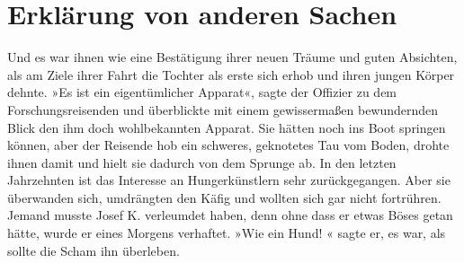 \section{Erklärung von anderen Sachen}\label{s:AndereSachen}

Und es war ihnen wie eine Bestätigung ihrer neuen Träume und guten Absichten, als am Ziele ihrer Fahrt die Tochter als erste sich erhob und ihren jungen Körper dehnte. »Es ist ein eigentümlicher Apparat«, sagte der Offizier zu dem Forschungsreisenden und überblickte mit einem gewissermaßen bewundernden Blick den ihm doch wohlbekannten Apparat. Sie hätten noch ins Boot springen können, aber der Reisende hob ein schweres, geknotetes Tau vom Boden, drohte ihnen damit und hielt sie dadurch von dem Sprunge ab. In den letzten Jahrzehnten ist das Interesse an Hungerkünstlern sehr zurückgegangen. Aber sie überwanden sich, umdrängten den Käfig und wollten sich gar nicht fortrühren. Jemand musste Josef K. verleumdet haben, denn ohne dass er etwas Böses getan hätte, wurde er eines Morgens verhaftet. »Wie ein Hund! « sagte er, es war, als sollte die Scham ihn überleben.